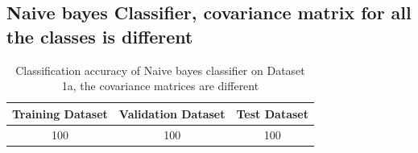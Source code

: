 \documentclass[11pt]{article}
\begin{document}
\newpage
\subsection{Naive bayes Classifier, covariance matrix for all the classes is different}

\begin{table}[h!]
\label{tab:tab1.1.1}
\begin{center}
\begin{tabular}{|c|c|c|}
\hline
\textbf{Training Dataset} & \textbf{Validation Dataset} &\textbf{Test Dataset}\\
\hline
100 & 100 & 100\\
\hline
\end{tabular}
\caption{Classification accuracy of Naive bayes classifier on Dataset 1a,  the covariance matrices are different}
\end{center}
\end{table}
\end{document}
